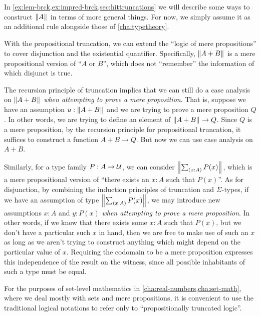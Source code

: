 In \autoref{ex:lem-brck,ex:impred-brck,sec:hittruncations} we will describe some ways to construct $\mathopen{}\left\Vert A\right\Vert_{}\mathclose{}$ in terms of more general things.
For now, we simply assume it as an additional rule alongside those of \autoref{cha:typetheory}.

With the propositional truncation, we can extend the ``logic of mere propositions'' to cover disjunction and the existential quantifier.
Specifically, $\mathopen{}\left\Vert A+B\right\Vert_{}\mathclose{}$ is a mere propositional version of ``$A$ or $B$'', which does not ``remember'' the information of which disjunct is true.

The recursion principle of truncation implies that we can still do a case analysis on $\mathopen{}\left\Vert A+B\right\Vert_{}\mathclose{}$ \emph{when attempting to prove a mere proposition}.
That is, suppose we have an assumption $u:\mathopen{}\left\Vert A+B\right\Vert_{}\mathclose{}$ and we are trying to prove a mere proposition $Q$.
In other words, we are trying to define an element of $\mathopen{}\left\Vert A+B\right\Vert_{}\mathclose{} \to Q$.
Since $Q$ is a mere proposition, by the recursion principle for propositional truncation, it suffices to construct a function $A+B\to Q$.
But now we can use case analysis on $A+B$.

Similarly, for a type family $P:A\to\mathcal{U}$, we can consider $\brck{\sm{x:A} P(x)}$, which is a mere propositional version of ``there exists an $x:A$ such that $P(x)$''.
As for disjunction, by combining the induction principles of truncation and $\Sigma$-types, if we have an assumption of type $\brck{\sm{x:A} P(x)}$, we may introduce new assumptions $x:A$ and $y:P(x)$ \emph{when attempting to prove a mere proposition}.
In other words, if we know that there exists some $x:A$ such that $P(x)$, but we don't have a particular such $x$ in hand, then we are free to make use of such an $x$ as long as we aren't trying to construct anything which might depend on the particular value of $x$.
Requiring the codomain to be a mere proposition expresses this independence of the result on the witness, since all possible inhabitants of such a type must be equal.

For the purposes of set-level mathematics in \autoref{cha:real-numbers,cha:set-math},
where we deal mostly with sets and mere propositions, it is convenient to use the
traditional logical notations to refer only to ``propositionally truncated logic''.

